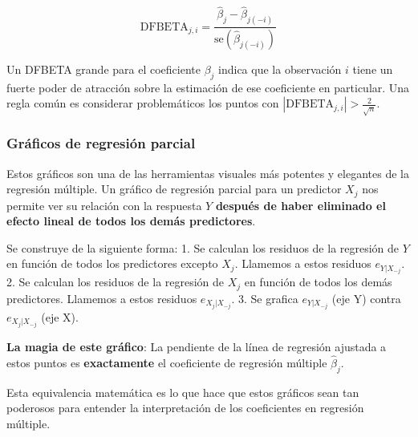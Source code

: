 \documentclass[
  letterpaper,
  DIV=11,
  numbers=noendperiod]{scrreprt}
\begin{document}
\[\text{DFBETA}_{j,i} = \frac{\hat{\beta}_j - \hat{\beta}_{j(-i)}}{\text{se}(\hat{\beta}_{j(-i)})}\]

Un DFBETA grande para el coeficiente \(\beta_j\) indica que la
observación \(i\) tiene un fuerte poder de atracción sobre la estimación
de ese coeficiente en particular. Una regla común es considerar
problemáticos los puntos con
\(|\text{DFBETA}_{j,i}| > \frac{2}{\sqrt{n}}\).

\subsubsection{Gráficos de regresión
parcial}\label{gruxe1ficos-de-regresiuxf3n-parcial}

Estos gráficos son una de las herramientas visuales más potentes y
elegantes de la regresión múltiple. Un gráfico de regresión parcial para
un predictor \(X_j\) nos permite ver su relación con la respuesta \(Y\)
\textbf{después de haber eliminado el efecto lineal de todos los demás
predictores}.

Se construye de la siguiente forma: 1. Se calculan los residuos de la
regresión de \(Y\) en función de todos los predictores excepto \(X_j\).
Llamemos a estos residuos \(e_{Y|X_{-j}}\). 2. Se calculan los residuos
de la regresión de \(X_j\) en función de todos los demás predictores.
Llamemos a estos residuos \(e_{X_j|X_{-j}}\). 3. Se grafica
\(e_{Y|X_{-j}}\) (eje Y) contra \(e_{X_j|X_{-j}}\) (eje X).

\begin{tcolorbox}[enhanced jigsaw, breakable, toprule=.15mm, bottomtitle=1mm, coltitle=black, colbacktitle=quarto-callout-warning-color!10!white, titlerule=0mm, opacitybacktitle=0.6, bottomrule=.15mm, toptitle=1mm, title=\textcolor{quarto-callout-warning-color}{\faExclamationTriangle}\hspace{0.5em}{Propiedad clave de los gráficos de regresión parcial}, arc=.35mm, rightrule=.15mm, opacityback=0, colframe=quarto-callout-warning-color-frame, leftrule=.75mm, left=2mm, colback=white]

\textbf{La magia de este gráfico}: La pendiente de la línea de regresión
ajustada a estos puntos es \textbf{exactamente} el coeficiente de
regresión múltiple \(\hat{\beta}_j\).

Esta equivalencia matemática es lo que hace que estos gráficos sean tan
poderosos para entender la interpretación de los coeficientes en
regresión múltiple.

\end{tcolorbox}
\end{document}
